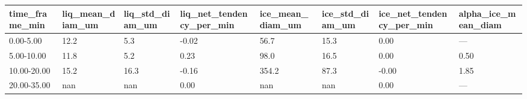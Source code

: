 \begin{tabular}{llllllll}
\toprule
time_frame_min & liq_mean_diam_um & liq_std_diam_um & liq_net_tendency_per_min & ice_mean_diam_um & ice_std_diam_um & ice_net_tendency_per_min & alpha_ice_mean_diam \\
\midrule
0.00-5.00 & 12.2 & 5.3 & -0.02 & 56.7 & 15.3 & 0.00 & — \\
5.00-10.00 & 11.8 & 5.2 & 0.23 & 98.0 & 16.5 & 0.00 & 0.50 \\
10.00-20.00 & 15.2 & 16.3 & -0.16 & 354.2 & 87.3 & -0.00 & 1.85 \\
20.00-35.00 & nan & nan & 0.00 & nan & nan & 0.00 & — \\
\bottomrule
\end{tabular}
